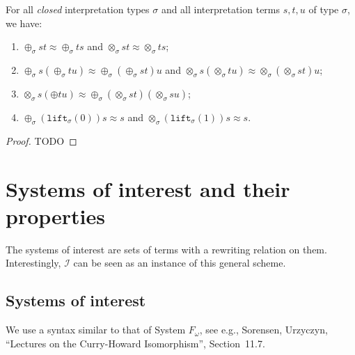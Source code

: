 \documentclass[runningheads,a4paper]{llncs}
\newcommand{\Iterms}{\mathcal{I}}
\newcommand{\lift}{\mathtt{lift}}
\begin{document}
\begin{lemma}\label{lem:approxproperties}
For all \emph{closed} interpretation types $\sigma$ and all
interpretation terms $s,t,u$ of type $\sigma$, we have:
\begin{enumerate}
\item\label{lem:approx:symmetry}
  $\oplus_\sigma s t \approx \oplus_\sigma t s$ and
  $\otimes_\sigma s t \approx \otimes_\sigma t s$;
\item\label{lem:approx:assoc} $\oplus_\sigma s (\oplus_\sigma t u)
  \approx \oplus_\sigma(\oplus_\sigma s t) u$ and $\otimes_\sigma s
  (\otimes_\sigma t u) \approx \otimes_\sigma(\otimes_\sigma s t) u$;
\item\label{lem:approx:distribution} $\otimes_\sigma s (\oplus t u)
  \approx \oplus_\sigma(\otimes_\sigma s t) (\otimes_\sigma s u)$;
\item\label{lem:approx:neutral} $\oplus_\sigma(\lift_\sigma(0)) s
  \approx s$ and $\otimes_\sigma(\lift_\sigma(1)) s \approx s$.
\end{enumerate}
\end{lemma}

\begin{proof}
TODO
\end{proof}

\section{Systems of interest and their properties}\label{sec:systems}

The systems of interest are sets of terms with a rewriting relation on
them. Interestingly, $\Iterms$ can be seen as an instance of this
general scheme.

\subsection{Systems of interest}

We use a syntax similar to that of System $F_\omega$, see e.g.,
Sorensen, Urzyczyn, ``Lectures on the Curry-Howard Isomorphism'',
Section~11.7.
\end{document}
